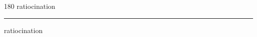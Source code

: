 
\begin{frame}
\begin{center}
\begin{turn}{180}
{\fontsize{2.5cm}{1em}\selectfont ratiocination}
\end{turn}
\vspace{1em}\par  
\hrule
\vspace{1em}\par  
{\fontsize{2.5cm}{1em}\selectfont ratiocination}
\end{center}
\end{frame}
